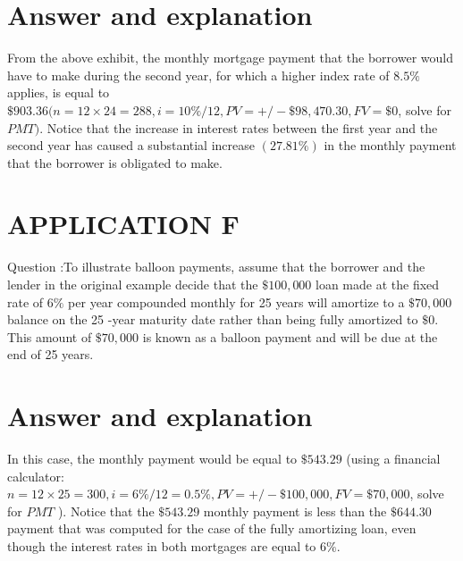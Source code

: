 \documentclass[11pt]{article}
\begin{document}
\section*{Answer and explanation}
From the above exhibit, the monthly mortgage payment that the borrower would have to make during the second year, for which a higher index rate of $8.5 \%$ applies, is equal to $\$ 903.36(n=12 \times 24=288, i=10 \% / 12, P V=+/-\$ 98,470.30, F V=\$ 0$, solve for $P M T)$. Notice that the increase in interest rates between the first year and the second year has caused a substantial increase $(27.81 \%)$ in the monthly payment that the borrower is obligated to make.

\section*{APPLICATION F}
Question :To illustrate balloon payments, assume that the borrower and the lender in the original example decide that the $\$ 100,000$ loan made at the fixed rate of $6 \%$ per year compounded monthly for 25 years will amortize to a $\$ 70,000$ balance on the 25 -year maturity date rather than being fully amortized to $\$ 0$. This amount of $\$ 70,000$ is known as a balloon payment and will be due at the end of 25 years.

\section*{Answer and explanation}
In this case, the monthly payment would be equal to $\$ 543.29$ (using a financial calculator: $n=12 \times 25=300, i=6 \% / 12=0.5 \%, P V=+/-\$ 100,000, F V=\$ 70,000$, solve for $P M T$ ). Notice that the $\$ 543.29$ monthly payment is less than the $\$ 644.30$ payment that was computed for the case of the fully amortizing loan, even though the interest rates in both mortgages are equal to $6 \%$.
\end{document}
